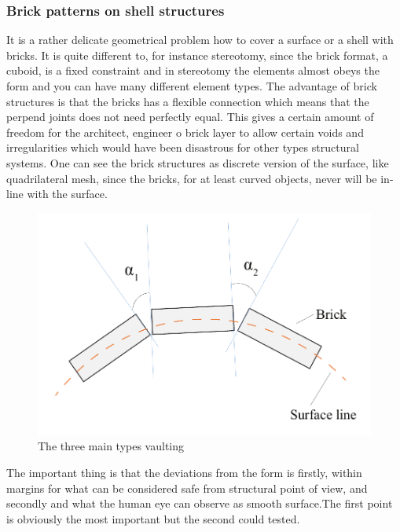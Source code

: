 \subsubsection{Brick patterns on shell structures} \label{sec:brickPatt}

It is a rather delicate geometrical problem how to cover a surface or a shell with bricks. It is quite  different to, for instance stereotomy,  since the brick format, a cuboid, is a fixed constraint and in stereotomy the elements almost obeys the form and you can have many different element types. The advantage of brick structures  is that the bricks has a flexible connection which means that the perpend joints does not need perfectly equal. This gives a certain amount of freedom for the architect, engineer o brick layer to allow certain voids and irregularities which would have been disastrous for other types structural systems. One can see the brick structures as discrete version of the surface, like quadrilateral mesh, since the bricks, for at least curved objects, never will be in-line with the surface. 
\begin{figure}[H]
\centering
\includegraphics[width=0.8\linewidth ]{figure/Introduction/brickgeo2.pdf}
\caption{The three main types vaulting}
\end{figure}

The important thing is that the deviations from the form  is firstly, within margins for what can be considered safe from structural point of view, and secondly and what the human eye can observe as smooth surface.The first point is obviously the most important but the second could tested.  



